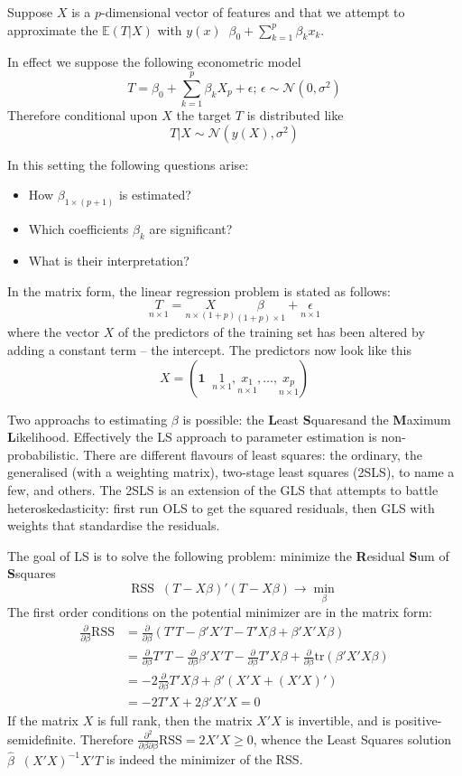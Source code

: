\documentclass[a4paper]{article}
\newcommand{\brac}[1]{{\left ( #1 \right )}}
\newcommand{\induc}[1]{{\left . #1 \right \vert}}
\newcommand{\Ncal}{\mathcal{N}}
\newcommand{\Ex}[0]{{\mathbb{E}}}
\newcommand{\RSS}{\text{RSS}}
\newcommand{\tr}{\text{tr}}
\newcommand{\one}{\mathbf{1}}
\newcommand{\defn}{\mathop{\overset{\Delta}{=}}\nolimits}
\begin{document}
Suppose $X$ is a $p$-dimensional vector of features and that we attempt to approximate the $\Ex(T\rvert X)$ with $y(x) \defn \beta_0 + \sum_{k=1}^p \beta_k x_k$.

In effect we suppose the following econometric model
\[T = \beta_0 + \sum_{k=1}^p \beta_k X_p + \epsilon;\,\epsilon\sim\Ncal(0,\sigma^2)\]
Therefore conditional upon $X$ the target $T$ is distributed like \[\induc{T}X\sim \Ncal(y(X),\sigma^2)\]

In this setting the following questions arise: \begin{itemize}
	\item How $\beta_{1\times(p+1)}$ is estimated?
	\item Which coefficients $\beta_k$ are significant?
	\item What is their interpretation?
\end{itemize}

In the matrix form, the linear regression problem is stated as follows:
\[\underset{n\times 1}{T} = \underset{n\times (1+p)}{X}\underset{(1+p)\times 1}{\beta} + \underset{n\times 1}{\epsilon}\]
where the vector $X$ of the predictors of the training set has been altered by adding a constant term -- the intercept. The predictors now look like this
\[X = \brac{ \one \defn \underset{n\times 1}{1}, \underset{n\times 1}{x_1}, \ldots, \underset{n\times 1}{x_p} }\]

Two approachs to estimating $\beta$ is possible: the \textbf{L}east \textbf{S}quares\footnotemark  and the \textbf{M}aximum \textbf{L}ikelihood.
Effectively the LS approach to parameter estimation is non-probabilistic.
There are different flavours of least squares: the ordinary, the generalised (with a weighting matrix), two-stage least squares (2SLS), to name a few, and others.
The 2SLS is an extension of the GLS that attempts to battle heteroskedasticity:
first run OLS to get the squared residuals, then GLS with weights that standardise the residuals.

The goal of LS is to solve the following problem: minimize the \textbf{R}esidual \textbf{S}um of \textbf{S}squares
\[\RSS \defn \brac{T-X\beta}'\brac{T-X\beta} \to \min_\beta\]
The first order conditions on the potential minimizer are in the matrix form:
\begin{align*}
	\frac{\partial}{\partial \beta}\RSS &= \frac{\partial}{\partial \beta}\brac{T'T-\beta'X'T - T'X\beta + \beta'X'X\beta}\\
	&= \frac{\partial}{\partial \beta} T'T - \frac{\partial}{\partial \beta} \beta'X'T - \frac{\partial}{\partial \beta} T'X\beta + \frac{\partial}{\partial \beta} \tr\brac{\beta'X'X\beta}\\
	&= - 2 \frac{\partial}{\partial \beta} T'X\beta + \beta'\brac{X'X + \brac{X'X}'}\\
	&= - 2 T'X + 2 \beta'X'X = 0
\end{align*}
If the matrix $X$ is full rank, then the matrix $X'X$ is invertible, and is positive-semidefinite.
Therefore $\frac{\partial^2}{\partial \beta\partial \beta}\RSS = 2 X'X \geq 0$, whence the Least Squares solution $\hat{\beta} \defn \brac{X'X}^{-1} X'T$ is indeed the minimizer of the RSS.
\end{document}
